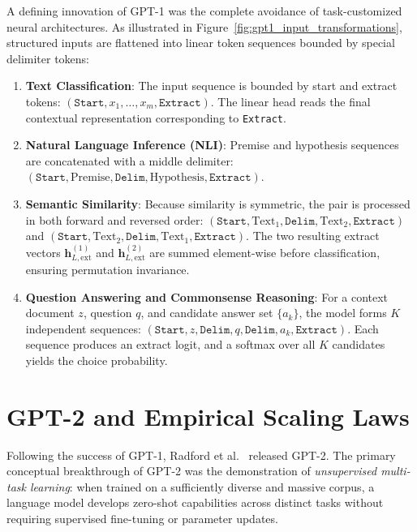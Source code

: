 \documentclass[../../main.tex]{subfiles}
\begin{document}
A defining innovation of GPT-1 was the complete avoidance of task-customized neural architectures. As illustrated in Figure~\ref{fig:gpt1_input_transformations}, structured inputs are flattened into linear token sequences bounded by special delimiter tokens:
\begin{enumerate}
    \item \textbf{Text Classification}: The input sequence is bounded by start and extract tokens: $(\texttt{Start}, x_1, \dots, x_m, \texttt{Extract})$. The linear head reads the final contextual representation corresponding to \texttt{Extract}.
    \item \textbf{Natural Language Inference (NLI)}: Premise and hypothesis sequences are concatenated with a middle delimiter: $(\texttt{Start}, \text{Premise}, \texttt{Delim}, \text{Hypothesis}, \texttt{Extract})$.
    \item \textbf{Semantic Similarity}: Because similarity is symmetric, the pair is processed in both forward and reversed order: $(\texttt{Start}, \text{Text}_1, \texttt{Delim}, \text{Text}_2, \texttt{Extract})$ and $(\texttt{Start}, \text{Text}_2, \texttt{Delim}, \text{Text}_1, \texttt{Extract})$. The two resulting extract vectors $\mathbf{h}_{L, \text{ext}}^{(1)}$ and $\mathbf{h}_{L, \text{ext}}^{(2)}$ are summed element-wise before classification, ensuring permutation invariance.
    \item \textbf{Question Answering and Commonsense Reasoning}: For a context document $z$, question $q$, and candidate answer set $\{a_k\}$, the model forms $K$ independent sequences: $(\texttt{Start}, z, \texttt{Delim}, q, \texttt{Delim}, a_k, \texttt{Extract})$. Each sequence produces an extract logit, and a softmax over all $K$ candidates yields the choice probability.
\end{enumerate}


\section{GPT-2 and Empirical Scaling Laws}
\label{sec:gpt2_scaling_laws}

Following the success of GPT-1, Radford et al.~\cite{radford2019} released GPT-2. The primary conceptual breakthrough of GPT-2 was the demonstration of \emph{unsupervised multi-task learning}: when trained on a sufficiently diverse and massive corpus, a language model develops zero-shot capabilities across distinct tasks without requiring supervised fine-tuning or parameter updates.
\end{document}
